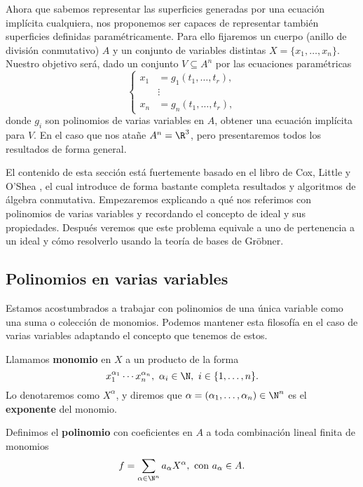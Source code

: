 Ahora que sabemos representar las superficies generadas por una ecuación implícita cualquiera, nos proponemos ser capaces de representar también superficies definidas paramétricamente. Para ello fijaremos un cuerpo (anillo de división conmutativo) $A$ y un conjunto de variables distintas $X=\{x_1,\dots, x_n\}$. Nuestro objetivo será, dado un conjunto $V\subseteq A^n$ por las ecuaciones paramétricas
\begin{equation}\label{eq:param}
    \begin{cases*}
    x_1 &= g_1(t_1,\dots, t_r),\\
    &\vdots \\
    x_n &= g_n(t_1,\dots, t_r),
\end{cases*}
\end{equation}
donde $g_i$ son polinomios de varias variables en $A$, obtener una ecuación implícita para $V$. En el caso que nos atañe $A^n=\R^3$, pero presentaremos todos los resultados de forma general.\newline

El contenido de esta sección está fuertemente basado en el libro  de Cox, Little y O'Shea \cite{ideals_varieties}, el cual introduce de forma bastante completa resultados y algoritmos de álgebra conmutativa. Empezaremos explicando a qué nos referimos con polinomios de varias variables y recordando el concepto de ideal y sus propiedades. Después veremos que este problema equivale a uno de pertenencia a un ideal y cómo resolverlo usando la teoría de bases de Gröbner.

\subsection{Polinomios en varias variables}
Estamos acostumbrados a trabajar con polinomios de una única variable como una suma o colección de monomios. Podemos mantener esta filosofía en el caso de varias variables adaptando el concepto que tenemos de estos.

\begin{definicion}\label{def:monomio}
    Llamamos \textbf{monomio} en $X$ a un producto de la forma
    $$x_1^{\alpha_1} \cdots x_n^{\alpha_n},\ \alpha_i \in \N,\ i\in\{1,\dots, n\}.$$
    Lo denotaremos como $X^{\alpha}$, y diremos que $\alpha = (\alpha_1,\dots, \alpha_n)\in \N^n$ es el \textbf{exponente} del monomio.
\end{definicion}

\begin{definicion}\label{def:polMultVar}
    Definimos el \textbf{polinomio} con coeficientes en $A$ a toda combinación lineal finita de monomios
    \begin{align*}
        f = \sum_{\alpha\in \N^n} a_{\alpha} X^{\alpha}, \text{ con } a_{\alpha} \in A.
    \end{align*}

\end{definicion}

